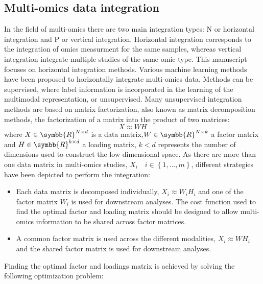 \documentclass[../main.tex]{subfiles}
\begin{document}


	\subsection{Multi-omics data integration}
		In the field of multi-omics there are two main integration types: N or horizontal integration and P or vertical integration.
		Horizontal integration corresponds to the integration of omics measurment for the same samples, whereas vertical integration integrate multiple studies of the same omic type.
		This manuscript focuses on horizontal integration methods.
		Various machine learning methods have been proposed to horizontally integrate multi-omics data.
		Methods can be supervised, where label information is incorporated in the learning of the multimodal representation, or unsupervised.
		Many unsupervised integration methods are based on matrix factorization, also known as matrix decomposition methods, the factorization of a matrix into the product of two matrices:
		\begin{equation}
			X \approx WH
		\end{equation}
		where \(X \in \symbb{R}^{N\times d}\) is a data matrix,\(W \in \symbb{R}^{N\times k}\) a factor matrix and \(H \in \symbb{R}^{k\times d}\) a loading matrix, \(k < d\) represents the number of dimensions used to construct the low dimensional space.
		As there are more than one data matrix in multi-omics studies, \(X_i\quad i \in \left\{1, \ldots, m\right\}\), different strategies have been depicted to perform the integration:
		\begin{itemize}[nosep]
			\item Each data matrix is decomposed individually, \(X_i \approx W_i H_i\) and one of the factor matrix \(W_i\) is used for downstream analyses. The cost function used to find the optimal factor and loading matrix should be designed to allow multi-omics information to be shared across factor matrices.
			\item A common factor matrix is used across the different modalities, \(X_i \approx WH_i\) and the shared factor matrix is used for downstream analyses.
		\end{itemize}
		Finding the optimal factor and loadings matrix is achieved by solving the following optimization problem:
\end{document}
